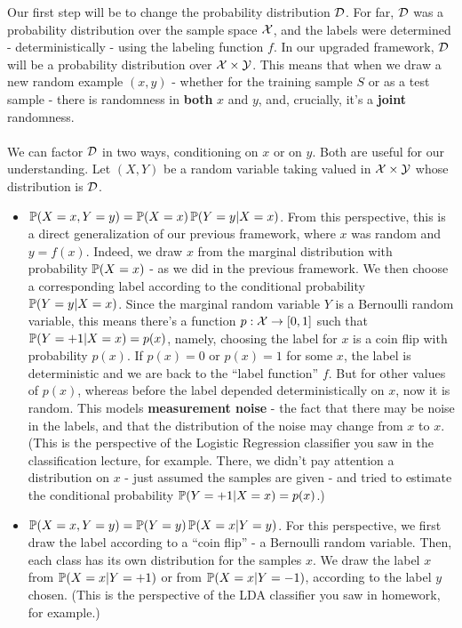   Our first step will be to change the probability distribution $\mathcal{D}$. For far,
  $\mathcal{D}$ was a probability distribution over the sample space $\mathcal{X}$, and the
  labels were determined - deterministically - using the labeling function $f$.
  In our upgraded framework, $\mathcal{D}$ will be a probability distribution over
  $\mathcal{X}\times \mathcal{Y}$. This means that when we draw a new random example $(x,y)$ - whether for
  the training sample $S$ or as a test sample - there is randomness in {\bf
  both} $x$ and $y$, and, crucially, it's a {\bf joint} randomness. 
  \\~\\
  We can factor $\mathcal{D}$ in two ways, conditioning on $x$ or on $y$. Both are useful for our understanding.
  Let $(X,Y)$ be a random variable taking valued in $\mathcal{X}\times \mathcal{Y}$ whose
  distribution is $\mathcal{D}$. 
\begin{itemize}
  \item $\operatorname*{\mathbb{P}}(X=x,Y=y)=\operatorname*{\mathbb{P}}(X=x)\operatorname*{\mathbb{P}}(Y=y|X=x)$. From this perspective, this is a direct
    generalization of our previous framework, where $x$ was random and $y=f(x)$.
    Indeed, we draw $x$ from the marginal distribution with probability
    $\operatorname*{\mathbb{P}}(X=x)$ - as we did in the previous framework. We then choose a corresponding 
    label according to the conditional probability $\operatorname*{\mathbb{P}}(Y=y|X=x)$. Since the
    marginal random variable $Y$ is a Bernoulli random variable, this means
    there's a function $p:\mathcal{X}\to[0,1]$ such that $\operatorname*{\mathbb{P}}(Y=+1|X=x)=p(x)$, namely,
    choosing the label for $x$ is a coin flip with probability $p(x)$. If
    $p(x)=0$ or $p(x)=1$ for some $x$, the label is deterministic and we are
    back to the ``label function'' $f$. But for other values of $p(x)$, whereas
    before the label depended deterministically on $x$, now it is random.
    This models {\bf measurement noise} - the fact that there may be noise in
    the labels, and that the distribution of the noise may change from $x$ to $x$. 
    (This is the perspective of the Logistic Regression classifier you saw in
    the classification lecture, for example. There, we didn't pay attention a
  distribution on $x$ - just assumed the samples are given - and tried to
estimate the conditional probability $\operatorname*{\mathbb{P}}(Y=+1|X=x)=p(x)$.)
  \item $\operatorname*{\mathbb{P}}(X=x,Y=y)=\operatorname*{\mathbb{P}}(Y=y)\operatorname*{\mathbb{P}}(X=x|Y=y)$. For this perspective, we
    first draw the label according to a ``coin flip'' -  a Bernoulli random
    variable. Then, each class has its own distribution for the samples $x$. We
    draw the label $x$ from $\operatorname*{\mathbb{P}}(X=x|Y=+1)$ or from $\operatorname*{\mathbb{P}}(X=x|Y=-1)$, according
    to the label $y$ chosen. (This is the perspective of the LDA classifier you
    saw in homework, for example.) 
\end{itemize}
  
